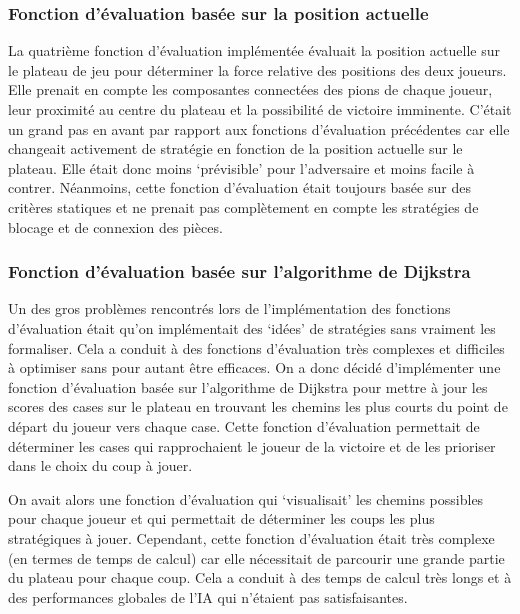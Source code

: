 \subsubsection{Fonction d'évaluation basée sur la position actuelle}
La quatrième fonction d'évaluation implémentée évaluait la position actuelle sur le plateau de jeu pour déterminer
la force relative des positions des deux joueurs. Elle prenait en compte les composantes connectées des pions de chaque joueur,
leur proximité au centre du plateau et la possibilité de victoire imminente.
C'était un grand pas en avant par rapport aux fonctions d'évaluation précédentes car elle changeait activement
de stratégie en fonction de la position actuelle sur le plateau. Elle était donc moins `prévisible' pour l'adversaire et 
moins facile à contrer.
Néanmoins, cette fonction d'évaluation était toujours basée sur des critères statiques et ne prenait pas complètement
en compte les stratégies de blocage et de connexion des pièces.

\subsubsection{Fonction d'évaluation basée sur l'algorithme de Dijkstra}
Un des gros problèmes rencontrés lors de l'implémentation des fonctions d'évaluation était qu'on implémentait
des `idées' de stratégies sans vraiment les formaliser. Cela a conduit à des fonctions d'évaluation très complexes
et difficiles à optimiser sans pour autant être efficaces.
On a donc décidé d'implémenter une fonction d'évaluation basée sur l'algorithme de Dijkstra pour mettre à jour
les scores des cases sur le plateau en trouvant les chemins les plus courts du point de départ du joueur vers chaque case.
Cette fonction d'évaluation permettait de déterminer les cases qui rapprochaient le joueur de la victoire et de les
prioriser dans le choix du coup à jouer.

On avait alors une fonction d'évaluation qui `visualisait' les chemins possibles pour chaque joueur et qui permettait
de déterminer les coups les plus stratégiques à jouer. 
Cependant, cette fonction d'évaluation était très complexe (en termes de temps de calcul) car elle nécessitait de parcourir
une grande partie du plateau pour chaque coup. Cela a conduit à des temps de calcul très longs et à des performances
globales de l'IA qui n'étaient pas satisfaisantes.


